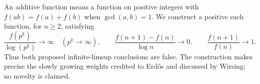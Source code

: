 An additive function means a function on positive integers
with \(f(ab)=f(a)+f(b)\) when \(\gcd(a,b)=1\).
We construct a positive such function, for \(n\geq2\), satisfying
\[
 \frac{f(p^k)}{\log(p^k)}\longrightarrow\infty
 \quad(p^k\longrightarrow\infty),
 \qquad
 \frac{f(n+1)-f(n)}{\log n}\longrightarrow0,
 \qquad
 \frac{f(n+1)}{f(n)}\longrightarrow1.
\]
Thus both proposed infinite-limsup conclusions are false.
The construction makes precise the slowly growing weights
credited to Erd\H{o}s and discussed by Wirsing; no novelty is claimed.
